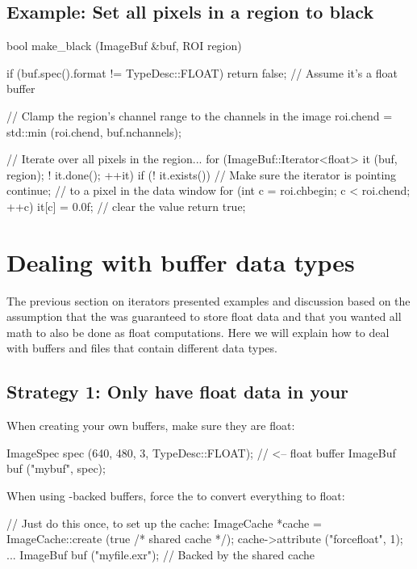 \subsection*{Example: Set all pixels in a region to black}
\label{makeblackexample}

\begin{code}
bool make_black (ImageBuf &buf, ROI region)
{
    if (buf.spec().format != TypeDesc::FLOAT)
        return false;    // Assume it's a float buffer

    // Clamp the region's channel range to the channels in the image
    roi.chend = std::min (roi.chend, buf.nchannels);

    // Iterate over all pixels in the region...
    for (ImageBuf::Iterator<float> it (buf, region);  ! it.done();  ++it) {
        if (! it.exists())   // Make sure the iterator is pointing
            continue;        //   to a pixel in the data window
        for (int c = roi.chbegin;  c < roi.chend;  ++c)
            it[c] = 0.0f;  // clear the value
    }
    return true;
}
\end{code}


\section{Dealing with buffer data types}

The previous section on iterators presented examples and discussion
based on the assumption that the \ImageBuf was guaranteed to store {\cf
float} data and that you wanted all math to also be done as {\cf float}
computations.  Here we will explain how to deal with buffers and files
that contain different data types.

\subsection*{Strategy 1: Only have {\cf float} data in your \ImageBuf}

\noindent When creating your own buffers, make sure they are {\cf float}:

\begin{code}
    ImageSpec spec (640, 480, 3, TypeDesc::FLOAT); // <-- float buffer
    ImageBuf buf ("mybuf", spec);
\end{code}

\noindent When using \ImageCache-backed buffers, force the \ImageCache
to convert everything to {\cf float}:

\begin{code}
    // Just do this once, to set up the cache:
    ImageCache *cache = ImageCache::create (true /* shared cache */);
    cache->attribute ("forcefloat", 1);
    ...
    ImageBuf buf ("myfile.exr");   // Backed by the shared cache
\end{code}

